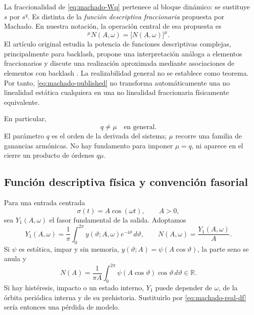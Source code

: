 La fraccionalidad de \cref{eq:machado-Wq} pertenece al bloque dinámico: se
sustituye \(s\) por \(s^q\). Es distinta de la
\emph{función descriptiva fraccionaria} propuesta por Machado. En nuestra
notación, la operación central de esa propuesta es
\begin{equation}
 {}^{\mu}\!N(A,\omega)
 =\bigl[N(A,\omega)\bigr]^\mu.
 \label{eq:machado-published}
\end{equation}
El artículo original estudia la potencia de funciones descriptivas complejas,
principalmente para backlash, propone una interpretación análoga a elementos
fraccionarios y discute una realización aproximada mediante asociaciones de
elementos con backlash \cite{Machado2015FDF}. La realizabilidad general no se
establece como teorema. Por tanto, \cref{eq:machado-published} no transforma
automáticamente una no linealidad estática cualquiera en una no linealidad
fraccionaria físicamente equivalente.

En particular,
\begin{equation}
 q\neq\mu\quad\text{en general}.
 \label{eq:q-not-mu}
\end{equation}
El parámetro \(q\) es el orden de la derivada del sistema; \(\mu\) recorre una
familia de ganancias armónicas. No hay fundamento para imponer \(\mu=q\), ni
aparece en el cierre un producto de órdenes \(q\mu\).

\subsection{Función descriptiva física y convención fasorial}

Para una entrada centrada
\[
 \sigma(t)=A\cos(\omega t),\qquad A>0,
\]
sea \(Y_1(A,\omega)\) el fasor fundamental de la salida. Adoptamos
\begin{equation}
 Y_1(A,\omega)
 =\frac{1}{\pi}\int_{0}^{2\pi}
 y(\vartheta;A,\omega)e^{-\mathrm i\vartheta}\,d\vartheta,
 \qquad
 N(A,\omega)=\frac{Y_1(A,\omega)}{A}.
 \label{eq:machado-classical-df}
\end{equation}
Si \(\psi\) es estática, impar y sin memoria,
\(y(\vartheta;A)=\psi(A\cos\vartheta)\), la parte seno se anula y
\begin{equation}
 N(A)=\frac{1}{\pi A}\int_{0}^{2\pi}
 \psi(A\cos\vartheta)\cos\vartheta\,d\vartheta\in\mathbb R.
 \label{eq:machado-real-df}
\end{equation}
Si hay histéresis, impacto o un estado interno, \(Y_1\) puede depender de
\(\omega\), de la órbita periódica interna y de su prehistoria. Sustituirlo por
\cref{eq:machado-real-df} sería entonces una pérdida de modelo.

